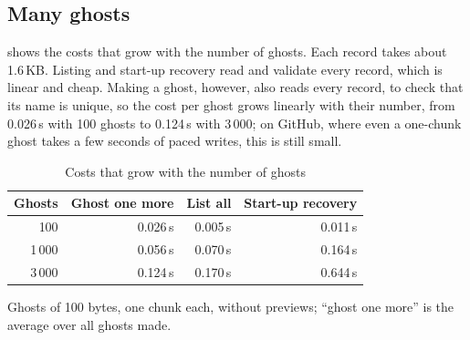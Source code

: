 \subsection{Many ghosts}
 shows the costs that grow with the number of ghosts. Each record takes about
1.6\,KB. Listing and start-up recovery read and validate every record, which is linear and cheap. Making
a ghost, however, also reads every record, to check that its name is unique, so the cost per ghost
grows linearly with their number, from 0.026\,s with 100 ghosts to 0.124\,s with 3\,000; on GitHub,
where even a one-chunk ghost takes a few seconds of paced writes, this is still small.

\begin{table}[t]
\caption{Costs that grow with the number of ghosts}\label{tab:scaling}
\centering\footnotesize
\begin{tabular}{@{}rrrr@{}}
\toprule
\textbf{Ghosts} & \textbf{Ghost one more} & \textbf{List all} & \textbf{Start-up recovery} \\
\midrule
100 & 0.026\,s & 0.005\,s & 0.011\,s \\
1\,000 & 0.056\,s & 0.070\,s & 0.164\,s \\
3\,000 & 0.124\,s & 0.170\,s & 0.644\,s \\
\bottomrule
\end{tabular}

\vspace{2pt}\raggedright\scriptsize Ghosts of 100 bytes, one chunk each, without previews; ``ghost one
more'' is the average over all ghosts made.
\end{table}
